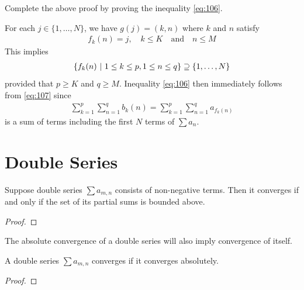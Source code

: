 \documentclass[thmcnt=section, 12pt]{my-elegantbook}
\begin{document}
\begin{exercise}
    Complete the above proof by proving the inequality \eqref{eq:106}.
    \label{ex:5}
\end{exercise}

\begin{solution}
    For each $j \in \{1, \ldots, N\}$, we have $g(j) = (k, n)$ where $k$ and $n$ satisfy
    \begin{align*}
        f_k(n) = j,
        \quad k \leq K
        \quad \text{and} \quad 
        n \leq M
    \end{align*}
    This implies
    \begin{align*}
        \left\{ f_k(n) \ \middle| \ 1 \leq k \leq p, 1 \leq n \leq q \right\}
        \supseteq \{1, \ldots, N\}
    \end{align*}
    provided that $p \geq K$ and $q \geq M$. Inequality \eqref{eq:106} then immediately follows from \eqref{eq:107} since
    \begin{align*}
        \sum_{k=1}^p \sum_{n=1}^q b_k(n)
        = \sum_{k=1}^p \sum_{n=1}^q a_{f_k(n)}
    \end{align*}
    is a sum of terms including the first $N$ terms of $\sum a_n$.
\end{solution}


\section{Double Series}


\begin{theorem} \label{thm:47}
    Suppose double series $\sum a_{m,n}$ consists of non-negative terms. Then it converges if and only if the set of its partial sums is bounded above.
\end{theorem}

\begin{proof}
\end{proof}


The absolute convergence of a double series will also imply convergence of itself.

\begin{theorem}
    A double series $\sum a_{m,n}$ converges if it converges absolutely.
\end{theorem}

\begin{proof}
\end{proof}
\end{document}
